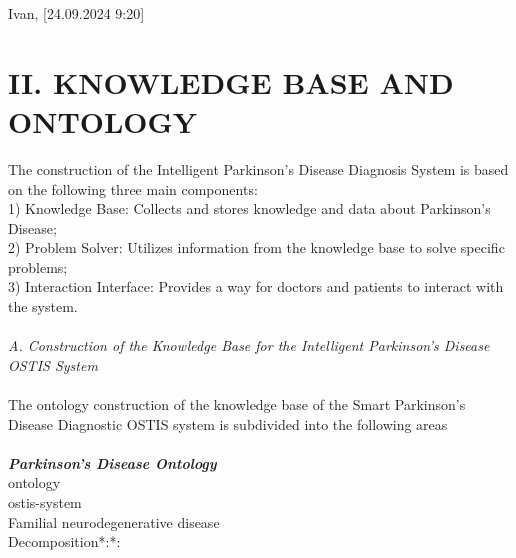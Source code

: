 \documentclass[a4paper,10pt,twocolumn]{article}
\begin{document}
Ivan, [24.09.2024 9:20]
\section*{II. KNOWLEDGE BASE AND ONTOLOGY}
The construction of the Intelligent Parkinson’s Disease
Diagnosis System is based on the following three main
components:\\
1) Knowledge Base: Collects and stores knowledge and
data about Parkinson’s Disease;\\
2) Problem Solver: Utilizes information from the
knowledge base to solve specific problems;\\
3) Interaction Interface: Provides a way for doctors and
patients to interact with the system.\\
\\ \textit{A. Construction of the Knowledge Base for the Intelligent
Parkinson’s Disease OSTIS System}\\
\\The ontology construction of the knowledge base of
the Smart Parkinson’s Disease Diagnostic OSTIS system
is subdivided into the following areas\\
\\ \textbf{\textit{Parkinson’s Disease Ontology}}\\
\subset ontology\\
\subset ostis-system\\
\subset Familial neurodegenerative disease\\
\Rightarrow Decomposition*:*:\\
\end{document}
